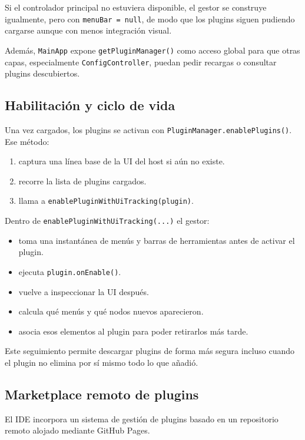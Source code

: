 \documentclass[../../main.tex]{subfiles}
\begin{document}
Si el controlador principal no estuviera disponible, el gestor se construye igualmente, pero con \lstinline|menuBar = null|, de modo que los plugins siguen pudiendo cargarse aunque con menos integración visual.

Además, \lstinline|MainApp| expone \lstinline|getPluginManager()| como acceso global para que otras capas, especialmente \lstinline|ConfigController|, puedan pedir recargas o consultar plugins descubiertos.

\subsection{Habilitación y ciclo de vida}

Una vez cargados, los plugins se activan con \lstinline|PluginManager.enablePlugins()|. Ese método:
\begin{enumerate}
    \item captura una línea base de la UI del host si aún no existe.
    \item recorre la lista de plugins cargados.
    \item llama a \lstinline|enablePluginWithUiTracking(plugin)|.
\end{enumerate}

Dentro de \lstinline|enablePluginWithUiTracking(...)| el gestor:

\begin{itemize}
    \item toma una instantánea de menús y barras de herramientas antes de activar el plugin.
    \item ejecuta \lstinline|plugin.onEnable()|.
    \item vuelve a inspeccionar la UI después.
    \item calcula qué menús y qué nodos nuevos aparecieron.
    \item asocia esos elementos al plugin para poder retirarlos más tarde.
\end{itemize}

Este seguimiento permite descargar plugins de forma más segura incluso cuando el plugin no elimina por sí mismo todo lo que añadió.

\subsection{Marketplace remoto de plugins}

El IDE incorpora un sistema de gestión de plugins basado en un repositorio remoto alojado mediante GitHub Pages. 
\end{document}
